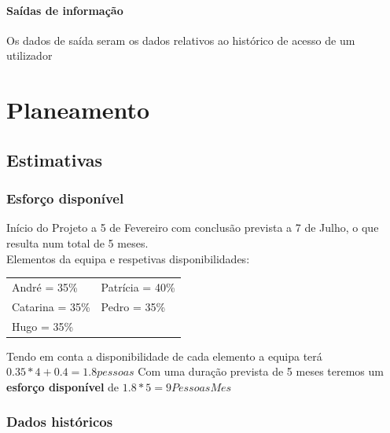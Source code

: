 \documentclass[a4paper]{report}
\begin{document}
\subsubsection*{Saídas de informação}
	Os dados de saída seram os dados relativos ao histórico de acesso de um utilizador 
\chapter{Planeamento}
\section{Estimativas}
\subsection{Esforço disponível}
Início do Projeto a 5 de Fevereiro com conclusão prevista a 7 de Julho, o que resulta num total de 5 meses.\\
Elementos da equipa e respetivas disponibilidades:\\

\begin{tabularx}{\textwidth}{XX}
	André = 35\%    & Patrícia = 40\% \\
	Catarina = 35\% & Pedro = 35\%    \\
	Hugo = 35\%     &
\end{tabularx}
\linebreak\linebreak
Tendo em conta a disponibilidade de cada elemento a equipa terá $0.35*4 + 0.4 =1.8 pessoas$\linebreak
Com uma duração prevista de 5 meses teremos um \textbf{esforço disponível} de $1.8*5=9 Pessoas Mes$
\subsection{Dados históricos}
\end{document}
